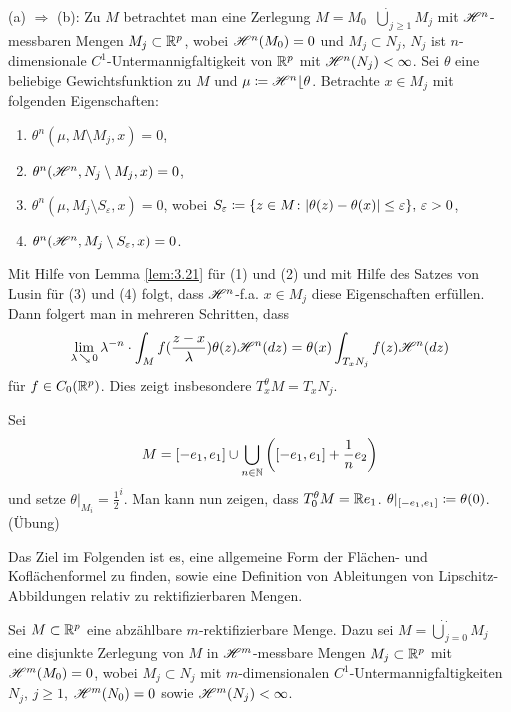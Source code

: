 \documentclass[a4paper,twoside,DIV15,BCOR12mm]{scrbook}
\newcommand{\HM}{\H}
\DeclareMathOperator{\downto}{\searrow}
\newcommand{\MR}{\lfloor}
\begin{document}
\begin{beweis}[Skizze]
(a) \(\Rightarrow\) (b): Zu \(M\) betrachtet man eine Zerlegung \(M = M_0 \mathop{\dot\cup} {\dot\bigcup}_{j\geq1} M_j\) mit \(\HM^n\)-messbaren Mengen \(M_j \subset \mathbb{R}^p\), wobei \(\HM^n(M_0)=0\) und \(M_j\subset N_j\), \(N_j\) ist \(n\)-dimensionale \(C^1\)-Unter\-mannig\-faltig\-keit von \(\mathbb{R}^p\) mit \(\HM^n(N_j)<\infty\). Sei \(\theta\) eine beliebige Gewichtsfunktion zu \(M\) und \(\mu \da \HM^n \MR \theta\). Betrachte \(x\in M_j\) mit folgenden Eigenschaften:
\begin{enumerate}[(1)]
\item \(\theta^n(\mu, M\setminus M_j, x)=0\),
\item \(\theta^n(\HM^n, N_j \setminus M_j, x) = 0\),
\item \(\theta^n(\mu, M_j \setminus S_\varepsilon, x) = 0\), wobei \(S_\varepsilon \da \{z\in M \colon |\theta(z)-\theta(x)|\leq\varepsilon\},\, \varepsilon>0\),
\item \(\theta^n(\HM^n, M_j\setminus S_\varepsilon, x)=0\).
\end{enumerate}
Mit Hilfe von Lemma \ref{lem:3.21} für (1) und (2) und mit Hilfe des Satzes von Lusin für (3) und (4) folgt, dass \(\HM^n\)-f.a. \(x\in M_j\) diese Eigenschaften erfüllen. Dann folgert man in mehreren Schritten, dass
\[
\lim_{\lambda\downto0} \lambda^{-n} \cdot \int_M f(\frac{z-x}\lambda) \theta(z) \HM^n(dz) = \theta(x) \int_{T_x N_j} f(z) \HM^n(dz)
\]
für \(f \in C_0(\mathbb{R}^p)\). Dies zeigt insbesondere \(T_x^\theta M = T_x N_j\).
\end{beweis}

\begin{beispiel} Sei
\[M = [-e_1, e_1] \cup \bigcup_{n \in \mathbb{N}} \left( [-e_1, e_1] + \frac1n e_2 \right)
\] und setze \(\theta|_{M_i} = \frac12 ^i\). Man kann nun zeigen, dass \(T_0^\theta M = \mathbb{R} e_1\). \(\theta|_{[-e_1,e_1]} \da \theta(0)\). (Übung)
\end{beispiel}


Das Ziel im Folgenden ist es, eine allgemeine Form der Flächen- und Koflächenformel zu finden, sowie eine Definition von Ableitungen von Lipschitz-Abbildungen relativ zu rektifizierbaren Mengen.

Sei $M\subset \mathbb{R}^p$ eine abzählbare $m$-rektifizierbare Menge. Dazu sei $M = \dot\bigcup_{j=0}^\cdot M_j$ eine  disjunkte Zerlegung von $M$ in $\HM^m$-messbare Mengen $M_j\subset\mathbb{R}^p$ mit $\HM^m(M_0)=0$, wobei $M_j\subset N_j$ mit $m$-dimensionalen $C^1$-Untermannigfaltigkeiten $N_j$, $j\ge 1$, $\HM^m(N_0)=0$ sowie $\HM^m(N_j)<\infty$.
\end{document}
